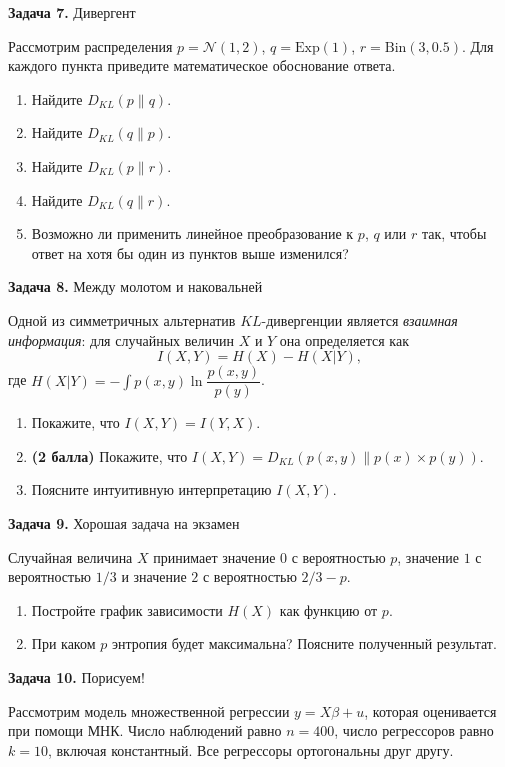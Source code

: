 \documentclass[10pt, a4paper]{extarticle}
\begin{document}
	{\Large \textbf{Задача 7.} Дивергент}
	
	Рассмотрим распределения $p = \mathcal{N}(1, 2)$, $q = \mathrm{Exp}(1)$, $r = \mathrm{Bin}(3, 0.5)$. Для каждого пункта приведите математическое обоснование ответа.
	
	\begin{enumerate}
		\item Найдите $D_{KL}(p \| q)$.
		\item Найдите $D_{KL}(q \| p)$.
		\item Найдите $D_{KL}(p \| r)$.
		\item Найдите $D_{KL}(q \| r)$.
		\item Возможно ли применить линейное преобразование к $p$, $q$ или $r$ так, чтобы ответ на хотя бы один из пунктов выше изменился? 
	\end{enumerate}

	{\Large \textbf{Задача 8.} Между молотом и наковальней}
	
	Одной из симметричных альтернатив $KL$-дивергенции является \textit{взаимная информация}: для случайных величин $X$ и $Y$ она определяется как
	\[
	I(X, Y) = H(X) - H(X | Y), 
	\] 
	где $H(X | Y) = - \int p(x, y) \ln \dfrac{p(x, y)}{p(y)}$.
	
	\begin{enumerate}
		\item Покажите, что $I(X, Y) = I(Y, X)$.
		\item \textbf{(2 балла)} Покажите, что $I(X, Y) = D_{KL}(p(x, y) \| p(x) \times p(y))$.
		\item Поясните интуитивную интерпретацию $I(X, Y)$.
	\end{enumerate}

	{\Large \textbf{Задача 9.} Хорошая задача на экзамен}
	
	Случайная величина $X$ принимает значение $0$ с вероятностью $p$, значение $1$ с вероятностью $1/3$ и значение $2$ с вероятностью $2/3 - p$. 
	
	\begin{enumerate}
		\item Постройте график зависимости $H(X)$ как функцию от $p$.
		\item При каком $p$ энтропия будет максимальна? Поясните полученный результат. 
	\end{enumerate}

	{\Large \textbf{Задача 10.} Порисуем!}
	
	Рассмотрим модель множественной регрессии $y = X\beta + u$, которая оценивается при помощи МНК. Число наблюдений равно $n = 400$, число регрессоров равно $k = 10$, включая константный. Все регрессоры ортогональны друг другу.
	
\end{document}
